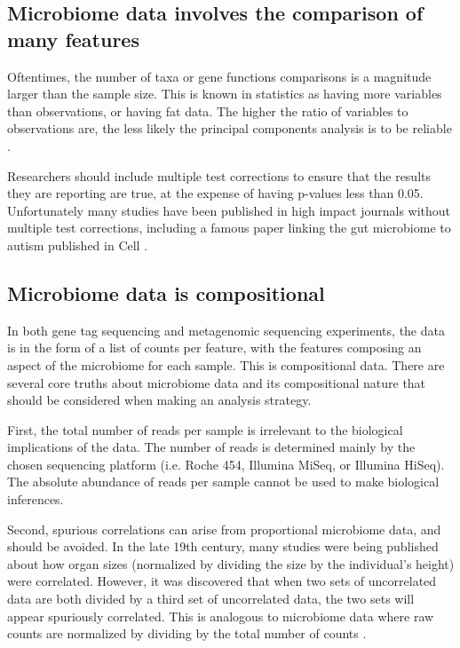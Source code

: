 \subsection{Microbiome data involves the comparison of many features}
Oftentimes, the number of taxa or gene functions comparisons is a magnitude larger than the sample size. This is known in statistics as having more variables than observations, or having fat data. The higher the ratio of variables to observations are, the less likely the principal components analysis is to be reliable \cite{osborne2004sample}.

Researchers should include multiple test corrections to ensure that the results they are reporting are true, at the expense of having p-values less than 0.05. Unfortunately many studies have been published in high impact journals without multiple test corrections, including a famous paper linking the gut microbiome to autism published in Cell \cite{hsiao2013microbiota}.

\subsection{Microbiome data is compositional}
In both gene tag sequencing and metagenomic sequencing experiments, the data is in the form of a list of counts per feature, with the features composing an aspect of the microbiome for each sample. This is compositional data. There are several core truths about microbiome data and its compositional nature that should be considered when making an analysis strategy.

First, the total number of reads per sample is irrelevant to the biological implications of the data. The number of reads is determined mainly by the chosen sequencing platform (i.e. Roche 454, Illumina MiSeq, or Illumina HiSeq). The absolute abundance of reads per sample cannot be used to make biological inferences.

Second, spurious correlations can arise from proportional microbiome data, and should be avoided. In the late 19th century, many studies were being published about how organ sizes (normalized by dividing the size by the individual's height) were correlated. However, it was discovered that when two sets of uncorrelated data are both divided by a third set of uncorrelated data, the two sets will appear spuriously correlated. This is analogous to microbiome data where raw counts are normalized by dividing by the total number of counts \cite{pearson1896mathematical}.

